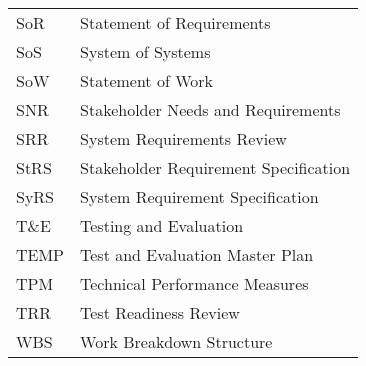 \documentclass[journal]{IEEEtran}
\begin{document}
\begin{tabular}{ l l }
SoR & Statement of Requirements \\
SoS & System of Systems \\
SoW & Statement of Work \\
SNR & Stakeholder Needs and Requirements \\
SRR & System Requirements Review \\
StRS & Stakeholder Requirement Specification \\
SyRS & System Requirement Specification \\
T\&E & Testing and Evaluation \\
TEMP & Test and Evaluation Master Plan \\
TPM & Technical Performance Measures \\
TRR & Test Readiness Review \\
WBS & Work Breakdown Structure \\
\end{tabular}
\end{document}

